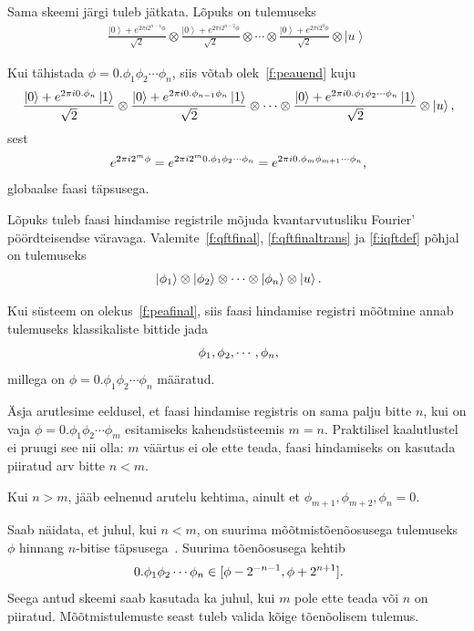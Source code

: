 \documentclass[12pt]{report}
\def\ket#1{\left|#1\right>}
\begin{document}
Sama skeemi järgi tuleb jätkata.
Lõpuks on tulemuseks
\begin{align}\label{f:peauend}
    \frac{\ket{0}+ e^{2\pi i2^{n-1}\phi}}{\sqrt{2}}
    \otimes \frac{\ket{0}+ e^{2\pi i2^{n-2}\phi}}{\sqrt{2}}
    \otimes\cdots
    \otimes \frac{\ket{0}+ e^{2\pi i2^0\phi}}{\sqrt{2}}
    \otimes\ket{u}
\end{align}

Kui tähistada \(\phi=0.\phi_1\phi_2\cdots\phi_n\), siis võtab olek~\ref{f:peauend} kuju
\begin{align}
    \frac{\ket{0}+ e^{2\pi i0.\phi_n}\ket{1}}{\sqrt{2}}
    \otimes \frac{\ket{0}+ e^{2\pi i0.\phi_{n-1}\phi_n}\ket{1}}{\sqrt{2}}
    \otimes\cdots
    \otimes \frac{\ket{0}+ e^{2\pi i0.\phi_1\phi_2\cdots\phi_n}\ket{1}}{\sqrt{2}}
    \otimes\ket{u} \rlap{,}
\end{align}
sest
\begin{align}
    e^{2\pi i2^m\phi}
    = e^{2\pi i2^m 0.\phi_1\phi_2\cdots\phi_n}
    = e^{2\pi i0.\phi_m\phi_{m+1}\cdots\phi_n} \rlap{,}
\end{align}
globaalse faasi täpsusega.

Lõpuks tuleb faasi hindamise registrile mõjuda kvantarvutusliku Fourier' pöördteisendse väravaga.
Valemite~\ref{f:qftfinal}, \ref{f:qftfinaltrans} ja \ref{f:iqftdef} põhjal on tulemuseks
\begin{align}\label{f:peafinal}
    \ket{\phi_1} \otimes \ket{\phi_2} \otimes \cdots \otimes \ket{\phi_n} \otimes \ket{u} \rlap{.}
\end{align}

Kui süsteem on olekus~\ref{f:peafinal}, siis faasi hindamise registri mõõtmine annab tulemuseks klassikaliste bittide jada
\begin{align}
    \phi_1, \phi_2, \cdots, \phi_n \rlap{,}
\end{align}
millega on \(\phi = 0.\phi_1\phi_2 \cdots \phi_n\) määratud.

Äsja arutlesime eeldusel, et faasi hindamise registris on sama palju bitte \(n\), kui on vaja \(\phi = 0.\phi_1\phi_2 \cdots \phi_m\) esitamiseks kahendsüsteemis \(m = n\).
Praktilisel kaalutlustel ei pruugi see nii olla: \(m\) väärtus ei ole ette teada, faasi hindamiseks on kasutada piiratud arv bitte \(n < m\).

Kui \(n > m\), jääb eelnenud arutelu kehtima, ainult et \(\phi_{m+1}, \phi_{m+2}, \phi_n = 0\).

Saab näidata, et juhul, kui \(n < m\), on suurima mõõtmistõenõosusega tulemuseks \(\phi\) hinnang \(n\)-bitise täpsusega~\cite{kaye+laflamme+mosca}.
Suurima tõenõosusega kehtib
\begin{equation}
    0.\phi_1\phi_2\cdots\phi_n \in [\phi - 2^{-n-1}, \phi + 2^{n+1}] \rlap{.}
\end{equation}
Seega antud skeemi saab kasutada ka juhul, kui \(m\) pole ette teada või \(n\) on piiratud.
Mõõtmis\-tulemuste seast tuleb valida kõige tõenõolisem tulemus.
\end{document}
